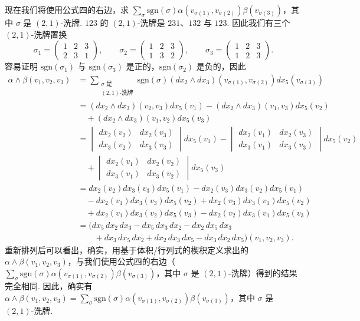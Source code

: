 现在我们将使用公式四的右边，求 $\sum_{\sigma}\mathrm{sgn}(\sigma)\alpha(v_{\sigma(1)},v_{\sigma(2)})\beta(v_{\sigma(3)})$，其中 $\sigma$ 是 $(2,1)$-洗牌. $123$ 的 $(2,1)$-洗牌是 $231$、$132$ 与 $123$. 因此我们有三个 $(2,1)$-洗牌置换
\[
\sigma_1=\begin{pmatrix}1&2&3\\2&3&1\end{pmatrix},\qquad
\sigma_2=\begin{pmatrix}1&2&3\\1&3&2\end{pmatrix},\qquad
\sigma_3=\begin{pmatrix}1&2&3\\1&2&3\end{pmatrix}.
\]
容易证明 $\mathrm{sgn}(\sigma_1)$ 与 $\mathrm{sgn}(\sigma_3)$ 是正的，$\mathrm{sgn}(\sigma_2)$ 是负的，因此
\begin{align*}
\alpha\wedge\beta(v_1,v_2,v_3)
&=\sum_{\substack{\sigma\text{ 是}\\ (2,1)\text{-洗牌}}}\mathrm{sgn}(\sigma)(dx_2\wedge dx_3)(v_{\sigma(1)},v_{\sigma(2)})dx_5(v_{\sigma(3)})\\
&=(dx_2\wedge dx_3)(v_2,v_3)dx_5(v_1)-(dx_2\wedge dx_3)(v_1,v_3)dx_5(v_2)\\
&\quad+(dx_2\wedge dx_3)(v_1,v_2)dx_5(v_3)\\
&=\begin{vmatrix}
dx_2(v_2) & dx_2(v_3)\\
dx_3(v_2) & dx_3(v_3)
\end{vmatrix}dx_5(v_1)
-\begin{vmatrix}
dx_2(v_1) & dx_2(v_3)\\
dx_3(v_1) & dx_3(v_3)
\end{vmatrix}dx_5(v_2)\\
&\quad+\begin{vmatrix}
dx_2(v_1) & dx_2(v_2)\\
dx_3(v_1) & dx_3(v_2)
\end{vmatrix}dx_5(v_3)\\
&=dx_2(v_2)dx_3(v_3)dx_5(v_1)-dx_2(v_3)dx_3(v_2)dx_5(v_1)\\
&\quad-dx_2(v_1)dx_3(v_3)dx_5(v_2)+dx_2(v_3)dx_3(v_1)dx_5(v_2)\\
&\quad+dx_2(v_1)dx_3(v_2)dx_5(v_3)-dx_2(v_2)dx_3(v_1)dx_5(v_3)\\
&=\bigl(dx_5\,dx_2\,dx_3-dx_5\,dx_3\,dx_2-dx_2\,dx_5\,dx_3\\
&\qquad+dx_3\,dx_5\,dx_2+dx_2\,dx_3\,dx_5-dx_3\,dx_2\,dx_5\bigr)(v_1,v_2,v_3).
\end{align*}
重新排列后可以看出，确实，用基于体积/行列式的楔积定义求出的 $\alpha\wedge\beta(v_1,v_2,v_3)$，与我们使用公式四的右边（$\sum_{\sigma}\mathrm{sgn}(\sigma)\alpha(v_{\sigma(1)},v_{\sigma(2)})\beta(v_{\sigma(3)})$，其中 $\sigma$ 是 $(2,1)$-洗牌）得到的结果完全相同. 因此，确实有 $\alpha\wedge\beta(v_1,v_2,v_3)=\sum_{\sigma}\mathrm{sgn}(\sigma)\alpha(v_{\sigma(1)},v_{\sigma(2)})\beta(v_{\sigma(3)})$，其中 $\sigma$ 是 $(2,1)$-洗牌.

